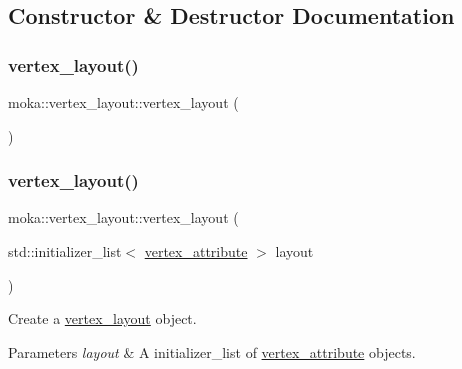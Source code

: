 \subsection{Constructor \& Destructor Documentation}
\mbox{\label{classmoka_1_1vertex__layout_a926b9988d845d058fff534685e6d96a7}} 
\subsubsection{\texorpdfstring{vertex\_layout()}{vertex\_layout()}\hspace{0.1cm}{\footnotesize\ttfamily [1/3]}}
{\footnotesize\ttfamily moka\+::vertex\+\_\+layout\+::vertex\+\_\+layout (\begin{DoxyParamCaption}{ }\end{DoxyParamCaption})\hspace{0.3cm}{\ttfamily [default]}}

\mbox{\label{classmoka_1_1vertex__layout_ad70128d474027c554da27cbcf1b3ec62}} 
\subsubsection{\texorpdfstring{vertex\_layout()}{vertex\_layout()}\hspace{0.1cm}{\footnotesize\ttfamily [2/3]}}
{\footnotesize\ttfamily moka\+::vertex\+\_\+layout\+::vertex\+\_\+layout (\begin{DoxyParamCaption}\item[{std\+::initializer\+\_\+list$<$ \mbox{\hyperlink{structmoka_1_1vertex__attribute}{vertex\+\_\+attribute}} $>$}]{layout }\end{DoxyParamCaption})}



Create a \mbox{\hyperlink{classmoka_1_1vertex__layout}{vertex\+\_\+layout}} object. 


\begin{DoxyParams}{Parameters}
{\em layout} & A initializer\+\_\+list of \mbox{\hyperlink{structmoka_1_1vertex__attribute}{vertex\+\_\+attribute}} objects. \\
\hline
\end{DoxyParams}
\mbox{\label{classmoka_1_1vertex__layout_ac5a5fa1f71676e010832f049533bd5ef}} 
